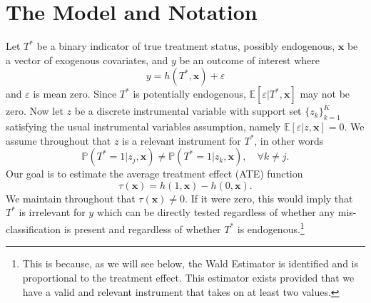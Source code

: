 \section{The Model and Notation}
Let $T^*$ be a binary indicator of true treatment status, possibly endogenous, $\mathbf{x}$ be a vector of exogenous covariates, and $y$ be an outcome of interest where
\begin{equation}
  y = h(T^*, \mathbf{x}) + \varepsilon
  \label{eq:model}
\end{equation}
and $\varepsilon$ is mean zero.
Since $T^*$ is potentially endogenous, $\mathbb{E}[\varepsilon|T^*,\mathbf{x}]$ may not be zero.
Now let $z$ be a discrete instrumental variable with support set $\{z_k\}_{k=1}^K$ satisfying the usual instrumental variables assumption, namely $\mathbb{E}[\varepsilon|z,\mathbf{x}]=0$.
We assume throughout that $z$ is a relevant instrument for $T^*$, in other words 
\begin{equation}
\mathbb{P}(T^*=1|z_j,\mathbf{x})\neq \mathbb{P}(T^*=1|z_k,\mathbf{x}), \quad \forall k\neq j.
\label{eq:relevance}
\end{equation}
Our goal is to estimate the average treatment effect (ATE) function
\begin{equation}
  \tau(\mathbf{x}) = h(1,\mathbf{x}) - h(0,\mathbf{x}).
  \label{eq:ATE}
\end{equation}
We maintain throughout that $\tau(\mathbf{x}) \neq 0$.
If it were zero, this would imply that $T^*$ is irrelevant for $y$ which can be directly tested regardless of whether any mis-classification is present and regardless of whether $T^*$ is endogenous.\footnote{This is because, as we will see below, the Wald Estimator is identified and is proportional to the treatment effect. This estimator exists provided that we have a valid and relevant instrument that takes on at least two values.} 

